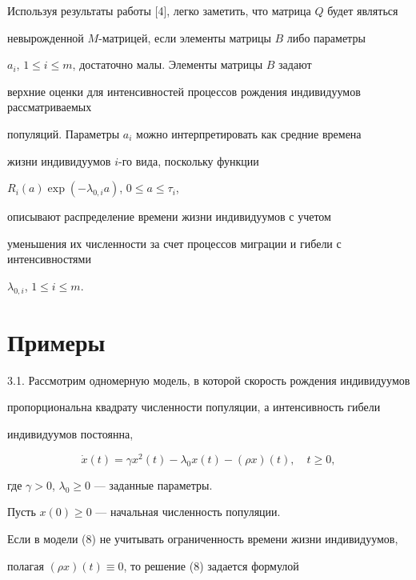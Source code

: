 \begin{notenonum}


Используя результаты работы [4], легко заметить, что матрица $Q$ будет являться


невырожденной $M$-матрицей, если элементы матрицы $B$ либо параметры


$a_i$, $1 \le i \le m$, достаточно малы. Элементы матрицы $B$ задают


верхние оценки для интенсивностей процессов рождения индивидуумов рассматриваемых


популяций. Параметры $a_i$ можно интерпретировать как средние времена


жизни индивидуумов $i$-го вида, поскольку функции


$R_i (a)\exp(-\lambda_{0,i}a)$, $0 \le a \le \tau_i$,


описывают распределение времени жизни индивидуумов с учетом


уменьшения их численности за счет процессов миграции и гибели с интенсивностями


$\lambda_{0,i}$, $1 \le i \le m$.


\end{notenonum}





\section{Примеры}





3.1. Рассмотрим одномерную модель, в которой скорость рождения индивидуумов


пропорциональна квадрату численности популяции, а интенсивность гибели


индивидуумов постоянна,


\begin{equation}


\Dot x(t) = \gamma x^2(t)-\lambda_0 x(t)-(\rho x)(t), \quad t \ge 0,


\end{equation}


где $\gamma > 0$, $\lambda_0 \ge 0$ --- заданные параметры.


Пусть $x(0) \ge 0$ --- начальная численность популяции.


Если в модели (8) не учитывать ограниченность времени жизни индивидуумов,


полагая $(\rho x)(t) \equiv 0$, то решение (8) задается формулой 


